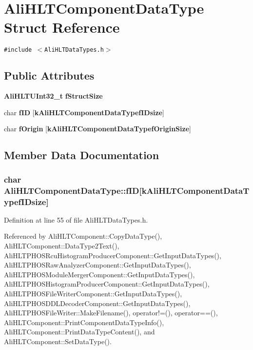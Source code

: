 \section{Ali\-HLTComponent\-Data\-Type Struct Reference}
\label{structAliHLTComponentDataType}
{\tt \#include $<$Ali\-HLTData\-Types.h$>$}

\subsection*{Public Attributes}
\begin{CompactItemize}
\item 
{\bf Ali\-HLTUInt32\_\-t} {\bf f\-Struct\-Size}
\item 
char {\bf f\-ID} [{\bf k\-Ali\-HLTComponent\-Data\-Typef\-IDsize}]
\item 
char {\bf f\-Origin} [{\bf k\-Ali\-HLTComponent\-Data\-Typef\-Origin\-Size}]
\end{CompactItemize}


\subsection{Member Data Documentation}
\subsubsection{\setlength{\rightskip}{0pt plus 5cm}char {\bf Ali\-HLTComponent\-Data\-Type::f\-ID}[{\bf k\-Ali\-HLTComponent\-Data\-Typef\-IDsize}]}\label{structAliHLTComponentDataType_o1}




Definition at line 55 of file Ali\-HLTData\-Types.h.

Referenced by Ali\-HLTComponent::Copy\-Data\-Type(), Ali\-HLTComponent::Data\-Type2Text(), Ali\-HLTPHOSRcu\-Histogram\-Producer\-Component::Get\-Input\-Data\-Types(), Ali\-HLTPHOSRaw\-Analyzer\-Component::Get\-Input\-Data\-Types(), Ali\-HLTPHOSModule\-Merger\-Component::Get\-Input\-Data\-Types(), Ali\-HLTPHOSHistogram\-Producer\-Component::Get\-Input\-Data\-Types(), Ali\-HLTPHOSFile\-Writer\-Component::Get\-Input\-Data\-Types(), Ali\-HLTPHOSDDLDecoder\-Component::Get\-Input\-Data\-Types(), Ali\-HLTPHOSFile\-Writer::Make\-Filename(), operator!=(), operator==(), Ali\-HLTComponent::Print\-Component\-Data\-Type\-Info(), Ali\-HLTComponent::Print\-Data\-Type\-Content(), and Ali\-HLTComponent::Set\-Data\-Type().
